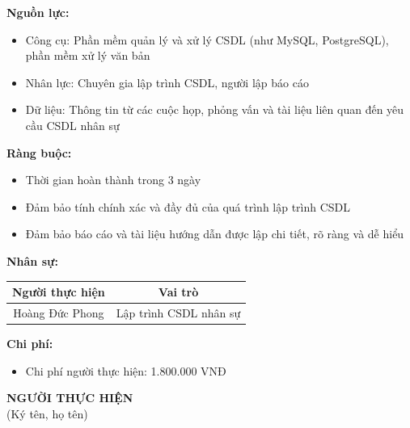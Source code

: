 {\begin{minipage}{\textwidth}
    \noindent \textbf{Nguồn lực:}
    \begin{itemize}
        \item Công cụ: Phần mềm quản lý và xử lý CSDL (như MySQL, PostgreSQL), phần mềm xử lý văn bản
        \item Nhân lực: Chuyên gia lập trình CSDL, người lập báo cáo
        \item Dữ liệu: Thông tin từ các cuộc họp, phỏng vấn và tài liệu liên quan đến yêu cầu CSDL nhân sự
    \end{itemize}
    \vspace{0.5cm}
    \noindent \textbf{Ràng buộc:}
    \begin{itemize}
        \item Thời gian hoàn thành trong 3 ngày
        \item Đảm bảo tính chính xác và đầy đủ của quá trình lập trình CSDL
        \item Đảm bảo báo cáo và tài liệu hướng dẫn được lập chi tiết, rõ ràng và dễ hiểu
    \end{itemize}
    \vspace{0.5cm}
    \noindent \textbf{Nhân sự:}
    \begin{longtable}{|c|c|}
    \hline
    \textbf{Người thực hiện} & \textbf{Vai trò} \\
    \hline
    Hoàng Đức Phong & Lập trình CSDL nhân sự \\
    \hline
    \end{longtable}
    \vspace{0.5cm}
    \noindent \textbf{Chi phí:}
    \begin{itemize}
        \item Chi phí người thực hiện: 1.800.000 VNĐ
    \end{itemize}
    \vspace{1cm}
    \begin{flushleft}
        \hspace{8cm} \textbf{NGƯỜI THỰC HIỆN} \\
        \hspace{8.8cm} (Ký tên, họ tên) \\
        \vspace{1cm}
    \end{flushleft}
    \end{minipage}
}
% 
